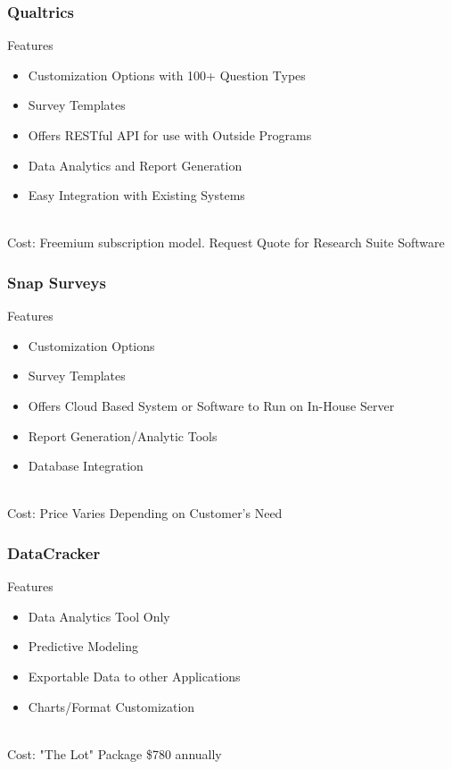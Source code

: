\documentclass{beamer}
\begin{document}
	\begin{frame}
		\frametitle{Qualtrics}
		Features
		\begin{itemize}
			\item Customization Options with 100+ Question Types
			\item Survey Templates
			\item Offers RESTful API for use with Outside Programs
			\item Data Analytics and Report Generation
			\item Easy Integration with Existing Systems
		\end{itemize}
		~\\
		Cost: Freemium subscription model. Request Quote for Research Suite Software
	\end{frame}
	
	\begin{frame}
		\frametitle{Snap Surveys}
		Features
		\begin{itemize}
			\item Customization Options
			\item Survey Templates
			\item Offers Cloud Based System or Software to Run on In-House Server
			\item Report Generation/Analytic Tools
			\item Database Integration
		\end{itemize}
		~\\
		Cost: Price Varies Depending on Customer's Need
	\end{frame}	
	
	\begin{frame}
		\frametitle{DataCracker}
		Features
		\begin{itemize}
			\item Data Analytics Tool Only
			\item Predictive Modeling
			\item Exportable Data to other Applications
			\item Charts/Format Customization
		\end{itemize}
		~\\
		Cost: "The Lot" Package \$780 annually
	\end{frame}
	
\end{document}
